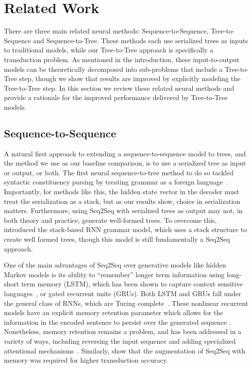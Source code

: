 \documentclass{article}
\begin{document}
\section{Related Work}
There are three main related neural methods: Sequence-to-Sequence, Tree-to-Sequence and Sequence-to-Tree. These methods each use serialized trees as inputs to traditional models, while our Tree-to-Tree approach is specifically a transduction problem. As mentioned in the introduction, these input-to-output models can be theoretically decomposed into sub-problems that include a Tree-to-Tree step, though we show that results are improved by explicitly modeling the Tree-to-Tree step.  In this section we review these related neural methods and provide a rationale for the improved performance delivered by Tree-to-Tree models.




\subsection{Sequence-to-Sequence}
A natural first approach to extending a sequence-to-sequence model to trees, and the method we use as our baseline comparison, is to use a serialized tree as input or output, or both.  The first neural sequence-to-tree method to do so tackled syntactic constituency parsing by treating grammar as a foreign language~\citep{vinyals2015grammar}. Importantly, for methods like this, the hidden state vector in the decoder must treat the serialization as a stack, but as our results show, choice in serialization matters.
Furthermore, using Seq2Seq with serialized trees as output may not, in both theory and practice, generate well-formed trees.  To overcome this, \citet{dyer2016recurrent} introduced the stack-based RNN grammar model, which uses a stack structure to create well formed trees, though this model is still fundamentally a Seq2Seq approach. 

One of the main advantages of Seq2Seq over generative models like hidden Markov models is its ability to ``remember'' longer term information using long-short term memory (LSTM), which has been shown to capture context sensitive languages~\citep{gers2001lstm}, or gated recurrent units (GRUs).  Both LSTM and GRUs fall under the general class of RNNs, which are Turing complete~\citep{siegelmann1995computational}. These nonlinear recurrent models have an explicit memory retention parameter which allows for the information in the encoded sentence to persist over the generated sequence \citep{lin2016critical}.  Nonetheless, memory retention remains a problem, and has been addressed in a variety of ways, including reversing the input sequence \citep{sutskever2014sequence} and adding specialized attentional mechanisms~\citep{bahdanau2014neural,luong2015effective, sukhbaatar2015end}.  Similarly, \citet{grefenstette2015learning} show that the augmentation of Seq2Seq with memory was required for higher transduction accuracy.
\end{document}
